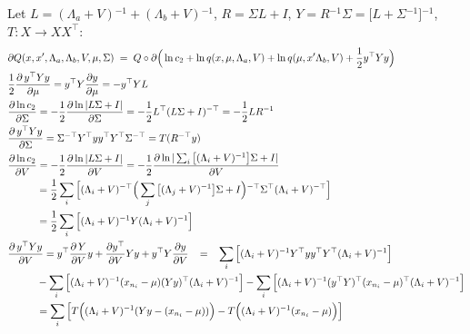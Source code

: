 \documentclass{article}
\newcommand{\inv}{{^{-1}}}
\newcommand{\invt}{{^{-\top}}}
\begin{document}
Let 
$L=(\Lambda_a+V)\inv+(\Lambda_b+V)\inv$, 
$R=\Sigma L+I$,
$Y=R\inv \Sigma=\big[L+\Sigma\inv\big]\inv$,
$T: X \rightarrow XX^\top$:
\begin{equation}
\begin{split}
&\partial Q(x,x',\Lambda_a,\Lambda_b,V, \mu, \Sigma)
\;=\; Q \circ \partial \Big( \ln c_2 + \ln q(x,\mu,\Lambda_a,V) + 
\ln q(\mu,x'\Lambda_b,V) + 
\frac{1}{2} y^\top Y y \Big) \\
&\frac{1}{2}\frac{\partial \, y^\top Y y}{\partial \mu} = 
y^\top  Y \frac{\partial y}{\partial \mu} = -y^\top YL \\
& \frac{\partial \ln c_2}{\partial \Sigma} = -\frac{1}{2}\frac{\partial \ln |L\Sigma +I|}{\partial\Sigma} = 
-\frac{1}{2}L^\top(L \Sigma+I)\invt = -\frac{1}{2}LR\inv \\
&\frac{\partial \, y^\top Y y}{\partial \Sigma} = 
\Sigma\invt Y^\top yy^\top  Y^\top\Sigma\invt =
T(R\invt y) \\
& \frac{\partial \ln c_2}{\partial V} = -\frac{1}{2}\frac{\partial \ln |L\Sigma +I|}{\partial V} = 
-\frac{1}{2}\frac{\partial \ln |\sum_i \big[(\Lambda_i+V)\inv\big]\Sigma +I|}{\partial V} \\
&\hspace{1.0cm} = \frac{1}{2} \sum_i \Big[ (\Lambda_i+V)\invt \Big(\sum_j \big[(\Lambda_j+V)\inv\big]\Sigma +I\Big)\invt \Sigma^\top (\Lambda_i+V)\invt \Big]
\\
&\hspace{1.0cm} =
\frac{1}{2} \sum_i \Big[ (\Lambda_i+V)\inv Y (\Lambda_i+V)\inv \Big]
\\
%
&\frac{\partial \, y^\top Y y}{\partial V} = 
y^\top \frac{\partial \,  Y}{\partial V} y + 
 \frac{\partial y^\top}{\partial V} Y y +  y^\top Y \frac{\partial y}{\partial V} 
\;\;\; = \;\;\;  \sum_i \Big[ (\Lambda_i+V)\inv Y^\top yy^\top Y^\top (\Lambda_i+V)\inv \Big] \\
&\hspace{1.0cm}  
- \sum_i \Big[ (\Lambda_i+V)\inv (x_{n_i}-\mu) (Y y)^\top (\Lambda_i+V)\inv \Big] 
- \sum_i \Big[ (\Lambda_i+V)\inv (y^\top Y)^\top (x_{n_i}-\mu)^\top (\Lambda_i+V)\inv \Big] \\
&\hspace{1.0cm} =   \sum_i \Big[ T \Big( (\Lambda_i+V)\inv (Yy - (x_{n_i}-\mu)) \Big) - 
T \Big( (\Lambda_i+V)\inv (x_{n_i}-\mu) \Big) \Big]
\end{split}
\end{equation}
\end{document}

